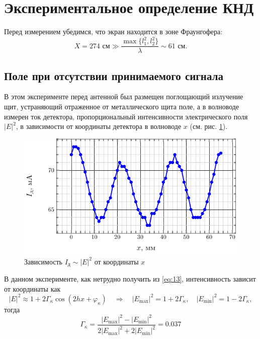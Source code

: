 \documentclass[a4paper,14pt]{extarticle}
\begin{document}
\newpage
\section{Экспериментальное определение КНД}
Перед измерением убедимся, что экран находится в зоне Фраунгофера:
\begin{equation}
    X = 274 \text{ см} \gg \frac{\max\{l_1^2,l_2^2\}}{\lambda} \sim 61 \text{ см}.
\end{equation}
\subsection{Поле при отсутствии принимаемого сигнала}
В этом эксперименте перед антенной был размещен поглощающий излучение щит, устраняющий отраженное от металлического щита поле, а в волноводе измерен ток детектора, пропорциональный интенсивности электрического поля $|E|^2$, в зависимости от координаты детектора в волноводе $x$ (см. рис. \ref{fig:exp:1}).

\begin{figure}[h!]
    \centering
    \includegraphics[scale=1.5]{fig/e2_from_x}
    \caption{Зависимость $I_\text{д}\sim|E|^2$ от координаты $x$}
    \label{fig:exp:1}
\end{figure}

В данном эксперименте, как нетрудно получить из \eqref{eq:13}, интенсивность зависит от координаты как
\begin{equation}
    |E|^2 \approx 1 + 2 \Gamma_{\kappa} \cos (2 h x + \varphi_{\kappa}) \quad \Rightarrow \quad
    |E_{\max}|^2=1+2\Gamma_\kappa, \quad
    |E_{\min}|^2=1-2\Gamma_\kappa,
    \label{eq:15}
\end{equation}
тогда
\begin{equation}
    \Gamma_{\kappa} = \frac{|E_{\max}|^2-|E_{\min}|^2}{2|E_{\max}|^2+2|E_{\min}|^2}=0.037
    \label{eq:16}
\end{equation}
\end{document}
